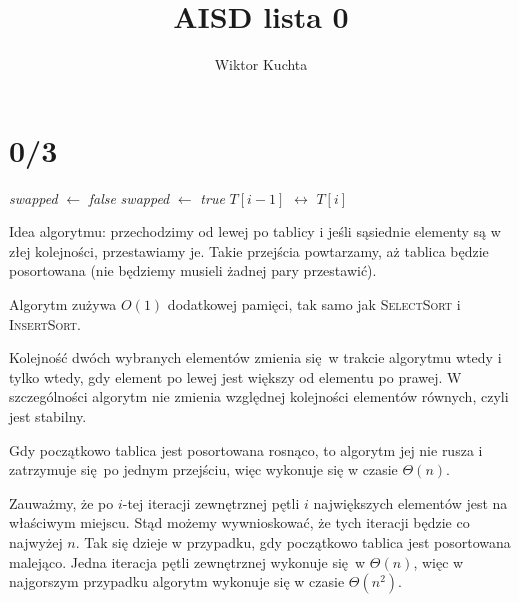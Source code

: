 \documentclass[a4paper, 12pt]{article}
\title{AISD lista 0}
\author{Wiktor Kuchta}
\date{\vspace{-4ex}}
\newcommand{\+}{\enspace}
\begin{document}
\maketitle

\section*{0/3}

\begin{algorithm}
	\begin{algorithmic}
			\Repeat
				\State \textit{swapped} $←$ \textit{false}
						\State \textit{swapped} $←$ \textit{true}
						\State $T[i-1]$ $\leftrightarrow$ $T[i]$
					\EndIf
				\EndFor
		\EndProcedure
	\end{algorithmic}
\end{algorithm}
Idea algorytmu: przechodzimy od lewej po tablicy i jeśli sąsiednie elementy są
w złej kolejności, przestawiamy je.  Takie przejścia powtarzamy, aż tablica
będzie posortowana (nie będziemy musieli żadnej pary przestawić).

Algorytm zużywa $O(1)$ dodatkowej pamięci,
tak samo jak \textsc{SelectSort} i \textsc{InsertSort}.

Kolejność dwóch wybranych elementów zmienia się w trakcie algorytmu wtedy i
tylko wtedy, gdy element po lewej jest większy od elementu po prawej.
W szczególności algorytm nie zmienia względnej kolejności elementów równych,
czyli jest stabilny.

Gdy początkowo tablica jest posortowana rosnąco, to algorytm jej nie rusza
i zatrzymuje się po jednym przejściu, więc wykonuje się w czasie $Θ(n)$.

Zauważmy, że po $i$-tej iteracji zewnętrznej pętli $i$ największych elementów
jest na właściwym miejscu.
Stąd możemy wywnioskować, że tych iteracji będzie co najwyżej $n$.
Tak się dzieje w przypadku, gdy początkowo tablica jest posortowana malejąco.
Jedna iteracja pętli zewnętrznej wykonuje się w $Θ(n)$, więc w najgorszym
przypadku algorytm wykonuje się w czasie $Θ(n^2)$.
\end{document}
